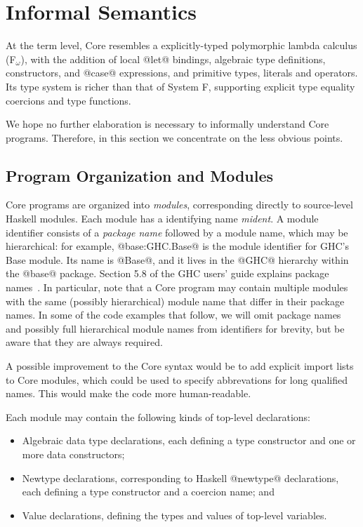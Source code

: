 \documentclass[10pt]{article}
\begin{document}
\section{Informal Semantics}
\label{sec:informal}

At the term level, Core resembles a explicitly-typed polymorphic lambda calculus (F$_\omega$), with the addition
of local @let@ bindings, algebraic type definitions, constructors, and @case@ expressions,
and primitive types, literals and operators. Its type system is richer than that of System F, supporting explicit type equality coercions and type functions.~\citep{system-fc}

We hope no further elaboration is necessary to informally understand Core programs. Therefore, in this section we concentrate on the less obvious points.

\subsection{Program Organization and Modules}
\label{sec:modules}

Core programs are organized into {\em modules}, corresponding directly to source-level Haskell modules.
Each module has a identifying name {\it mident}. A module identifier consists of a {\it package name} followed by a module name, which may be hierarchical: for example, @base:GHC.Base@ is the module identifier for GHC's Base module. Its name is @Base@, and it lives in the @GHC@ hierarchy within the @base@ package. Section 5.8 of the GHC users' guide explains package names~\citep{ghc-user-guide}. In particular, note that a Core program may contain multiple modules with the same (possibly hierarchical) module name that differ in their package names. In some of the code examples that follow, we will omit package names and possibly full hierarchical module names from identifiers for brevity, but be aware that they are always required.

A possible improvement to the Core syntax would be to add explicit import lists to Core modules, which could be used to specify abbrevations for long qualified names. This would make the code more human-readable.

Each module may contain the following kinds of top-level declarations:
\begin{itemize}
\item Algebraic data type declarations, each defining a type constructor and one or more data constructors;
\item Newtype declarations,  corresponding to Haskell @newtype@ declarations, each defining a type constructor and a coercion name; and
\item Value declarations, defining the types and values of top-level variables.
\end{itemize}
\end{document}
